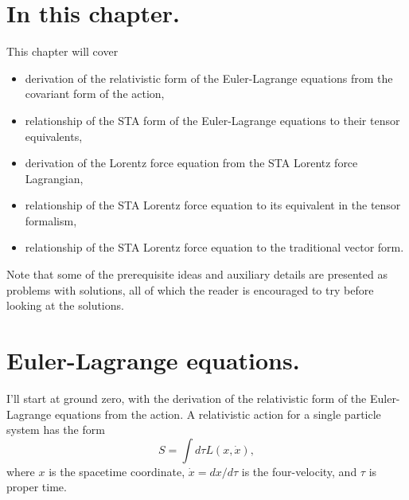 %
%
\section{In this chapter.}
This chapter will cover
\begin{itemize}
\item derivation of the relativistic form of the Euler-Lagrange equations from the covariant form of the action,
\item relationship of the STA form of the Euler-Lagrange equations to their tensor equivalents,
\item derivation of the Lorentz force equation from the STA Lorentz force Lagrangian,
\item relationship of the STA Lorentz force equation to its equivalent in the tensor formalism,
\item relationship of the STA Lorentz force equation to the traditional vector form.
\end{itemize}
Note that some of the prerequisite ideas and auxiliary details are presented as problems with solutions, all of which the reader is encouraged to try before looking at the solutions.
%
\section{Euler-Lagrange equations.}
I'll start at ground zero, with the derivation of the relativistic form of the Euler-Lagrange equations from the action.
A relativistic action for a single particle system has the form
\begin{dmath}\label{eqn:lorentzForceCovariant:20}
S = \int d\tau L(x, \dot{x}),
\end{dmath}
where
\( x \) is the spacetime coordinate, \( \dot{x} = dx/d\tau \) is the four-velocity,
and \( \tau \) is proper time.

